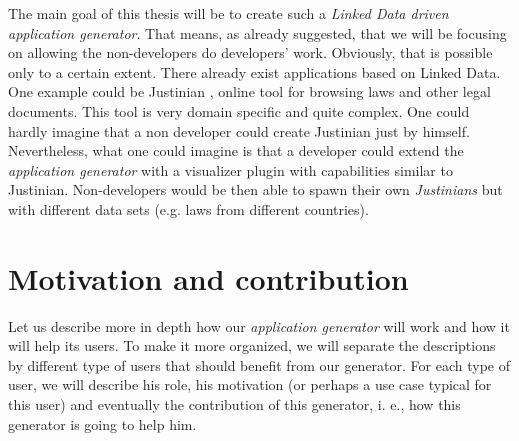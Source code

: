 The main goal of this thesis will be to create such a \emph{Linked Data driven application generator}. That means, as already suggested, that we will be focusing on allowing the non-developers do developers' work. Obviously, that is possible only to a certain extent. There already exist applications based on Linked Data. One example could be Justinian \cite{justinian}, online tool for browsing laws and other legal documents. This tool is very domain specific and quite complex. One could hardly imagine that a non developer could create Justinian just by himself. Nevertheless, what one could imagine is that a developer could extend the \emph{application generator} with a visualizer plugin with capabilities similar to Justinian. Non-developers would be then able to spawn their own \emph{Justinians} but with different data sets (e.g. laws from different countries).

\section*{Motivation and contribution}

Let us describe more in depth how our \emph{application generator} will work and how it will help its users. To make it more organized, we will separate the descriptions by different type of users that should benefit from our generator. For each type of user, we will describe his role, his motivation (or perhaps a use case typical for this user) and eventually the contribution of this generator, i. e., how this generator is going to help him.

